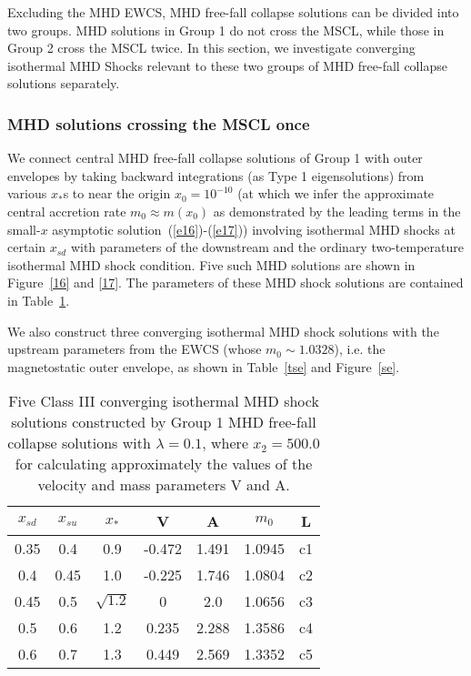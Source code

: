 \documentclass[fleqn,usenatbib]{mnras}
\begin{document}

Excluding the MHD EWCS, MHD free-fall collapse solutions can be divided into two groups. MHD solutions in Group 1 do not cross the MSCL, while those in Group 2 cross the MSCL twice. In this section, we investigate converging isothermal MHD Shocks relevant to these two groups of MHD free-fall collapse solutions separately.  

\subsubsection{MHD solutions crossing the MSCL once}
\label{s5.3.1}
We connect central MHD free-fall collapse solutions of Group 1 with outer envelopes by taking backward integrations (as Type 1 eigensolutions) from various $x_{*}$s to near the origin $x_{0}=10^{-10}$ (at which we infer the approximate central accretion rate $m_{0}\approx m(x_{0})$ as demonstrated by the leading terms in the small-$x$ asymptotic solution~(\ref{e16})-(\ref{e17})) involving isothermal MHD shocks at certain $x_{sd}$ with parameters of the downstream and the ordinary two-temperature isothermal MHD shock condition. Five such MHD solutions are shown in Figure~\ref{16} and \ref{17}. The parameters of these MHD shock solutions are contained in Table~\ref{t4}.

We also construct three converging isothermal MHD shock solutions with the upstream parameters from the EWCS (whose $m_{0}\sim 1.0328$), i.e. the magnetostatic outer envelope, as shown in Table~\ref{tse} and Figure~\ref{se}. 

\begin{table}
\centering
\caption{Five Class III converging isothermal MHD shock solutions constructed by Group 1 MHD free-fall collapse solutions with $\lambda=0.1$, where $x_{2}=500.0$ for calculating approximately the values of the velocity and mass parameters V and A.}
\begin{tabular}{ccccccc}
\hline
$x_{sd}$ & $x_{su}$ & $x_{*}$ & V & A & $m_{0}$ & L\\
\hline
0.35 & 0.4 & 0.9 & -0.472 & 1.491 & 1.0945 & c1\\
0.4 & 0.45 & 1.0 & -0.225 & 1.746 & 1.0804 & c2\\
0.45 & 0.5 & $\sqrt{1.2}$ & 0 & 2.0 & 1.0656 & c3\\
0.5 & 0.6 & 1.2 & 0.235 & 2.288 & 1.3586 & c4\\
0.6 & 0.7 & 1.3 & 0.449 & 2.569 & 1.3352 & c5\\
\hline
\end{tabular}
\label{t4}
\end{table}
\end{document}
